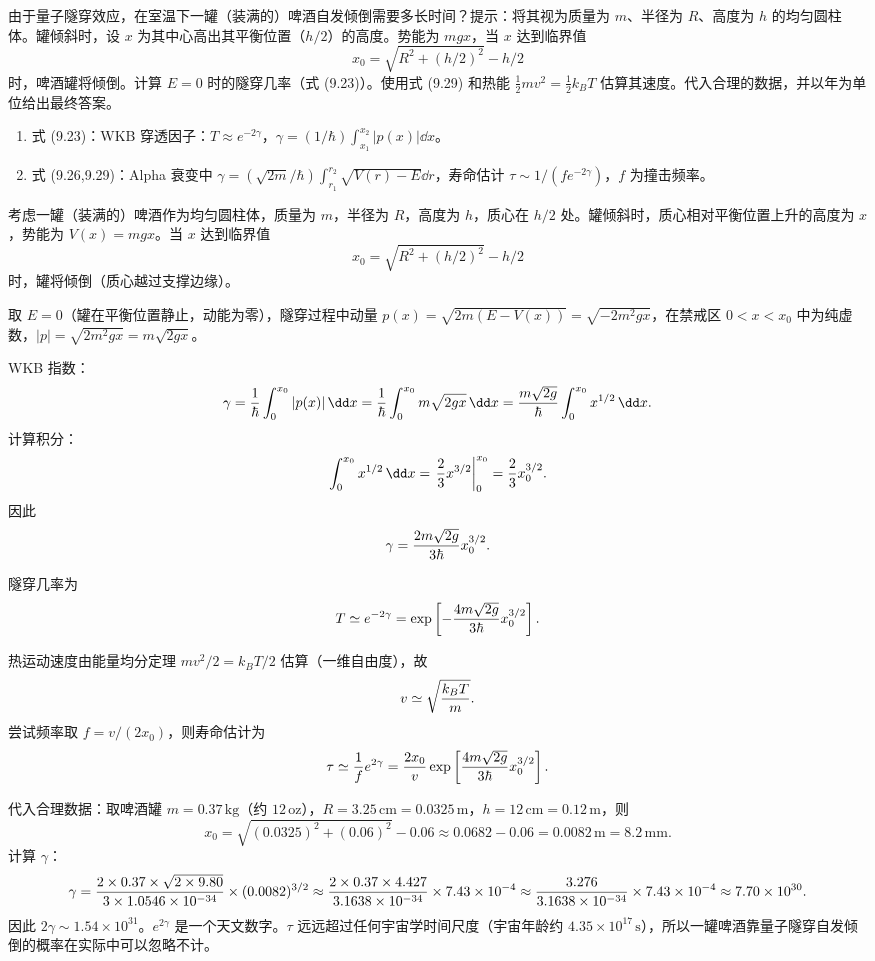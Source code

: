 \begin{question}
由于量子隧穿效应，在室温下一罐（装满的）啤酒自发倾倒需要多长时间？提示：将其视为质量为 $m$、半径为 $R$、高度为 $h$ 的均匀圆柱体。罐倾斜时，设 $x$ 为其中心高出其平衡位置（$h/2$）的高度。势能为 $mgx$，当 $x$ 达到临界值
\[
x_0=\sqrt{R^2+(h/2)^2}-h/2
\]
时，啤酒罐将倾倒。计算 $E=0$ 时的隧穿几率（式 (9.23)）。使用式 (9.29) 和热能 $\frac12mv^2=\frac12k_BT$ 估算其速度。代入合理的数据，并以年为单位给出最终答案。

\par\smallskip
{}
\begin{enumerate}[leftmargin=2.2em,itemsep=0.12em,topsep=0.12em,parsep=0pt]
\item 式 (9.23)：WKB 穿透因子：$T\approx e^{-2\gamma}$，$\gamma=(1/\hbar)\int_{x_1}^{x_2}|p(x)|\dd x$。
\item 式 (9.26,9.29)：Alpha 衰变中 $\gamma=(\sqrt{2m}/\hbar)\int_{r_1}^{r_2}\sqrt{V(r)-E}\dd r$，寿命估计 $\tau\sim 1/(f e^{-2\gamma})$，$f$ 为撞击频率。
\end{enumerate}

\end{question}
\begin{solution}
考虑一罐（装满的）啤酒作为均匀圆柱体，质量为 $m$，半径为 $R$，高度为 $h$，质心在 $h/2$ 处。罐倾斜时，质心相对平衡位置上升的高度为 $x$，势能为 $V(x)=mgx$。当 $x$ 达到临界值
\[
x_0=\sqrt{R^2+(h/2)^2}-h/2
\]
时，罐将倾倒（质心越过支撑边缘）。

取 $E=0$（罐在平衡位置静止，动能为零），隧穿过程中动量 $p(x)=\sqrt{2m(E-V(x))}=\sqrt{-2m^2gx}$，在禁戒区 $0<x<x_0$ 中为纯虚数，$|p|=\sqrt{2m^2gx}=m\sqrt{2gx}$。

WKB 指数：
\[
\gamma={1\over\hbar}\int_0^{x_0}|p(x)|\,\dd x
={1\over\hbar}\int_0^{x_0}m\sqrt{2gx}\,\dd x
={m\sqrt{2g}\over\hbar}\int_0^{x_0}x^{1/2}\,\dd x.
\]
计算积分：
\[
\int_0^{x_0}x^{1/2}\,\dd x=\left.{2\over3}x^{3/2}\right|_0^{x_0}={2\over3}x_0^{3/2}.
\]
因此
\[
\gamma={2m\sqrt{2g}\over3\hbar}x_0^{3/2}.
\]

隧穿几率为
\[
T\simeq e^{-2\gamma}
=\exp\left[-{4m\sqrt{2g}\over3\hbar}x_0^{3/2}\right].
\]

热运动速度由能量均分定理 $mv^2/2=k_BT/2$ 估算（一维自由度），故
\[
v\simeq\sqrt{k_BT\over m}.
\]
尝试频率取 $f=v/(2x_0)$，则寿命估计为
\[
\tau\simeq{1\over f}e^{2\gamma}
={2x_0\over v}\exp\left[{4m\sqrt{2g}\over3\hbar}x_0^{3/2}\right].
\]

代入合理数据：取啤酒罐 $m=0.37\,\mathrm{kg}$（约 $12\,\mathrm{oz}$），$R=3.25\,\mathrm{cm}=0.0325\,\mathrm{m}$，$h=12\,\mathrm{cm}=0.12\,\mathrm{m}$，则
\[
x_0=\sqrt{(0.0325)^2+(0.06)^2}-0.06\approx0.0682-0.06=0.0082\,\mathrm{m}=8.2\,\mathrm{mm}.
\]
计算 $\gamma$：
\[
\gamma={2\times0.37\times\sqrt{2\times9.80}\over3\times1.0546\times10^{-34}}\times(0.0082)^{3/2}
\approx{2\times0.37\times4.427\over3.1638\times10^{-34}}\times7.43\times10^{-4}
\approx{3.276\over3.1638\times10^{-34}}\times7.43\times10^{-4}
\approx 7.70\times10^{30}.
\]
因此 $2\gamma\sim1.54\times10^{31}$。$e^{2\gamma}$ 是一个天文数字。$\tau$ 远远超过任何宇宙学时间尺度（宇宙年龄约 $4.35\times10^{17}\,\mathrm{s}$），所以一罐啤酒靠量子隧穿自发倾倒的概率在实际中可以忽略不计。
\end{solution}


